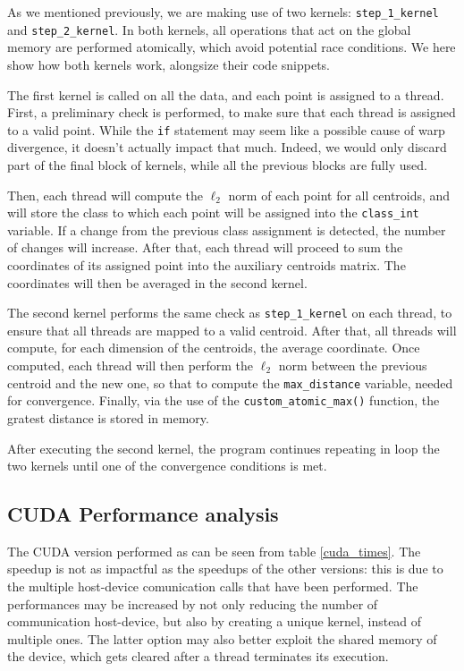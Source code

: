 \documentclass[11pt, journal]{IEEEtran}
\newcommand{\nwl}{

\vspace{11pt}

}
\begin{document}
As we mentioned previously, we are making use of two kernels: \verb|step_1_kernel| and \verb|step_2_kernel|. In both kernels, all operations that act on the global memory are performed atomically, which avoid potential race conditions. We here show how both kernels work, alongsize their code snippets.
\nwl
The first kernel is called on all the data, and each point is assigned to a thread. First, a preliminary check is performed, to make sure that each thread is assigned to a valid point. While the \verb|if| statement may seem like a possible cause of warp divergence, it doesn't actually impact that much. Indeed, we would only discard part of the final block of kernels, while all the previous blocks are fully used.
\nwl
Then, each thread will compute the $\ell_2$ norm of each point for all centroids, and will store the class to which each point will be assigned into the \verb|class_int| variable. If a change from the previous class assignment is detected, the number of changes will increase. After that, each thread will proceed to sum the coordinates of its assigned point into the auxiliary centroids matrix. The coordinates will then be averaged in the second kernel.
\nwl
The second kernel performs the same check as \verb|step_1_kernel| on each thread, to ensure that all threads are mapped to a valid centroid. After that, all threads will compute, for each dimension of the centroids, the average coordinate. Once computed, each thread will then perform the $\ell_2$ norm between the previous centroid and the new one, so that to compute the \verb|max_distance| variable, needed for convergence. Finally, via the use of the \verb|custom_atomic_max()| function, the gratest distance is stored in memory.
\nwl
After executing the second kernel, the program continues repeating in loop the two kernels until one of the convergence conditions is met.

\subsection{CUDA Performance analysis}

The CUDA version performed as can be seen from table \ref{cuda_times}. The speedup is not as impactful as the speedups of the other versions: this is due to the multiple host-device comunication calls that have been performed. The performances may be increased by not only reducing the number of communication host-device, but also by creating a unique kernel, instead of multiple ones. The latter option may also better exploit the shared memory of the device, which gets cleared after a thread terminates its execution.
\end{document}
